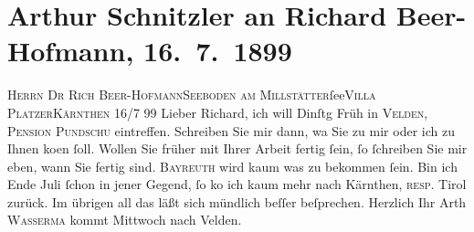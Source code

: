 

         
         \renewcommand{\erwaehntePersonen}{Personen: Richard Beer-Hofmann, Jakob Wassermann}
         \renewcommand{\erwaehnteOrte}{Orte: Bayreuth, Kärnten, Pension Pundschu, Seeboden, Tirol, Velden am Wörthersee, Villa Platzer, Wien}
         \renewcommand{\erwaehnteWerke}{}
               \section[Arthur Schnitzler an Richard Beer-Hofmann, 16. 7. 1899]{ Arthur Schnitzler an Richard Beer-Hofmann, 16. 7. 1899}\nopagebreak{}\rehead{ }\begin{ledgroupsized}[t]{13cm}\normalsize\beginnumbering \toendnotes[C]{\smallbreak\pagebreak[2]} 
\pstart{}{\pb}\textsc{Herrn Dr Rich Beer-Hofmann}\pend{}\pstart{}\textsc{Seeboden am Millstätter}ſee\pend{}\pstart{}\textsc{Villa Platzer}\pend{}\pstart{}\textsc{Kärnthen}\pend{}{\bigskip}\pstart
           \raggedleft{}{\pb}16/7 99\pend
           \pstart
           Lieber Richard, ich will Dinſtg{ }Früh in \textsc{Velden}, \textsc{Pension Pundschu} eintreffen. Schreiben Sie mir dann, wa{\geminationn} Sie zu mir
               oder ich zu Ihnen ko{\geminationm}en ſoll. {\pb}Wollen Sie früher mit Ihrer Arbeit fertig ſein, ſo
               ſchreiben Sie mir eben, wann Sie fertig sind.\pend
           \pstart
           \textsc{Bayreuth} wird kaum {\pb}was zu bekommen ſein.\pend
           \pstart
           Bin ich Ende Juli{ }ſchon in jener Gegend, ſo ko{\geminationm} ich kaum mehr nach Kärnthen, \textsc{resp}. Tirol zurück. Im übrigen all das läßt sich mündlich {\pb}beſſer beſprechen.\pend
           \pstart Herzlich Ihr \spacefill\mbox{Arth}\pend{}\pstart
           \textsc{Wasserma{\geminationn}} kommt Mittwoch nach Velden.\pend
           
         
         \endnumbering{}\end{ledgroupsized}  \newcommand{\dateiname}{L00945}\newcommand{\titel}{Arthur Schnitzler an Richard Beer-Hofmann, 16. 7. 1899}\newcommand{\editorInnen}{Martin Anton Müller und Gerd-Hermann Susen}
      